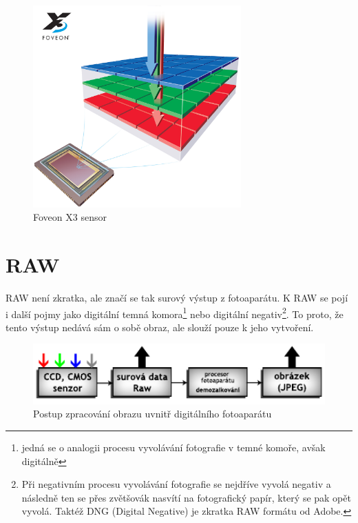 \documentclass[12pt,a4paper,titlepage,final]{report}
\begin{document}
\begin{figure}[ht]
\begin{center}
\includegraphics[width=8cm]{images/foveon-cfa.jpg}
\caption{Foveon X3 sensor}
\label{fig:foveon}
\end{center}
\end{figure}

\chapter{RAW}

RAW není zkratka, ale značí se tak surový výstup z fotoaparátu. K RAW se pojí i další pojmy jako digitální temná komora\footnote{jedná se o analogii procesu vyvolávání fotografie v temné komoře, avšak digitálně} nebo digitální negativ\footnote{Při negativním procesu vyvolávání fotografie se nejdříve vyvolá negativ a následně ten se přes zvětšovák nasvítí na fotografický papír, který se pak opět vyvolá. Taktéž DNG (Digital Negative) je zkratka RAW formátu od Adobe.}. To proto, že tento výstup nedává sám o sobě obraz, ale slouží pouze k jeho vytvoření.

\begin{figure}[ht]
\begin{center}
\includegraphics[width=14cm]{images/chain.pdf}
\caption{Postup zpracování obrazu uvnitř digitálního fotoaparátu}
\label{fig:chain}
\end{center}
\end{figure}
\end{document}
